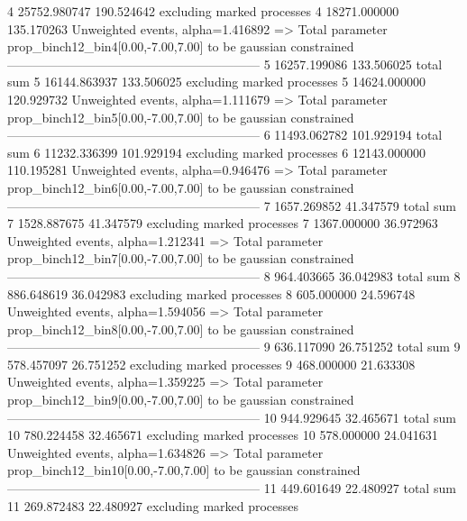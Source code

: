 4          25752.980747    190.524642      excluding marked processes    
4          18271.000000    135.170263      Unweighted events, alpha=1.416892
  => Total parameter prop_binch12_bin4[0.00,-7.00,7.00] to be gaussian constrained
------------------------------------------------------------
5          16257.199086    133.506025      total sum                     
5          16144.863937    133.506025      excluding marked processes    
5          14624.000000    120.929732      Unweighted events, alpha=1.111679
  => Total parameter prop_binch12_bin5[0.00,-7.00,7.00] to be gaussian constrained
------------------------------------------------------------
6          11493.062782    101.929194      total sum                     
6          11232.336399    101.929194      excluding marked processes    
6          12143.000000    110.195281      Unweighted events, alpha=0.946476
  => Total parameter prop_binch12_bin6[0.00,-7.00,7.00] to be gaussian constrained
------------------------------------------------------------
7          1657.269852     41.347579       total sum                     
7          1528.887675     41.347579       excluding marked processes    
7          1367.000000     36.972963       Unweighted events, alpha=1.212341
  => Total parameter prop_binch12_bin7[0.00,-7.00,7.00] to be gaussian constrained
------------------------------------------------------------
8          964.403665      36.042983       total sum                     
8          886.648619      36.042983       excluding marked processes    
8          605.000000      24.596748       Unweighted events, alpha=1.594056
  => Total parameter prop_binch12_bin8[0.00,-7.00,7.00] to be gaussian constrained
------------------------------------------------------------
9          636.117090      26.751252       total sum                     
9          578.457097      26.751252       excluding marked processes    
9          468.000000      21.633308       Unweighted events, alpha=1.359225
  => Total parameter prop_binch12_bin9[0.00,-7.00,7.00] to be gaussian constrained
------------------------------------------------------------
10         944.929645      32.465671       total sum                     
10         780.224458      32.465671       excluding marked processes    
10         578.000000      24.041631       Unweighted events, alpha=1.634826
  => Total parameter prop_binch12_bin10[0.00,-7.00,7.00] to be gaussian constrained
------------------------------------------------------------
11         449.601649      22.480927       total sum                     
11         269.872483      22.480927       excluding marked processes    
